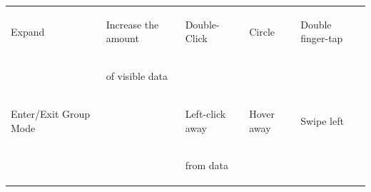 \documentclass[runningheads,a4paper]{llncs}
\begin{document}
\begin{table}[t]
\begin{center}
\begin{tabular}{| l | l | l | l | l |}
  \begin{tiny}Expand               \end{tiny}&\begin{tiny}Increase the amount  \end{tiny}&\begin{tiny}Double-Click   \end{tiny}&\begin{tiny}Circle        \end{tiny}&\begin{tiny}Double finger-tap\end{tiny}\vspace{-0.05in}\\
  \begin{tiny}                     \end{tiny}&\begin{tiny}of visible data      \end{tiny}&\begin{tiny}               \end{tiny}&\begin{tiny}              \end{tiny}&\begin{tiny}                 \end{tiny}\vspace{-0.02in}\\ \hline
  \begin{tiny}Enter/Exit Group Mode\end{tiny}&\begin{tiny}                     \end{tiny}&\begin{tiny}Left-click away\end{tiny}&\begin{tiny}Hover away    \end{tiny}&\begin{tiny}Swipe left       \end{tiny}\vspace{-0.05in}\\
  \begin{tiny}                     \end{tiny}&\begin{tiny}                     \end{tiny}&\begin{tiny}from data      \end{tiny}&\begin{tiny}              \end{tiny}&\begin{tiny}                 \end{tiny}\vspace{-0.02in}\\ \hline

\end{tabular}
\end{center}
\end{table}
\end{document}

